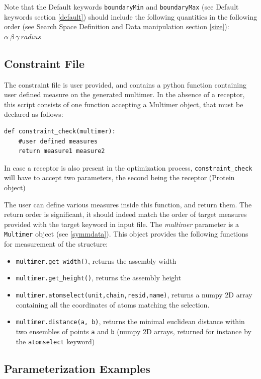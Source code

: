\documentclass[a4paper, 12pt]{article}
\begin{document}
Note that the Default keywords \texttt{boundaryMin} and \texttt{boundaryMax} (see Default keywords section \ref{default}) should include the following quantities in the following order (see Search Space Definition and Data manipulation section \ref{size}):\\
$\alpha~\beta~\gamma~radius$


\subsection{Constraint File \label{constraint}}

The constraint file is user provided, and contains a python function containing user defined measure on the generated multimer. In the absence of a receptor, this script consists of one function accepting a Multimer object, that must be declared as follows:
\begin{verbatim}
def constraint_check(multimer):
    #user defined measures
    return measure1 measure2
\end{verbatim}

In case a receptor is also present in the optimization process, \texttt{constraint\_check} will have to accept two parameters, the second being the receptor (Protein object)

The user can define various measures inside this function, and return them. The return order is significant, it should indeed match the order of target measures provided with the target keyword in input file. The \emph{multimer} parameter is a \texttt{Multimer} object (see \ref{symmdata}). This object provides the following functions for measurement of the structure: 

\begin{itemize}
\item \texttt{multimer.get\_width()}, returns the assembly width
\item \texttt{multimer.get\_height()}, returns the assembly height
\item \texttt{multimer.atomselect(unit,chain,resid,name)}, returns a numpy 2D array containing all the coordinates of atoms matching the selection.
\item \texttt{multimer.distance(a, b)}, returns the minimal euclidean distance within two ensembles of points \texttt{a} and \texttt{b} (numpy 2D arrays, returned for instance by the \texttt{atomselect} keyword)
\end{itemize}


\subsection{Parameterization Examples}
\end{document}

